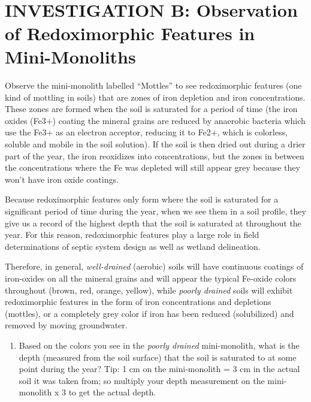 \documentclass[
  letterpaper,
  twocolumn,
  portrait]{scrbook}
\providecommand{\tightlist}{%
  \setlength{\itemsep}{0pt}\setlength{\parskip}{0pt}}\usepackage{longtable,booktabs,array}
\begin{document}
~ ~ ~

\hypertarget{investigation-b-observation-of-redoximorphic-features-in-mini-monoliths}{%
\section{INVESTIGATION B: Observation of Redoximorphic Features in
Mini-Monoliths}\label{investigation-b-observation-of-redoximorphic-features-in-mini-monoliths}}

Observe the mini-monolith labelled ``Mottles'' to see redoximorphic
features (one kind of mottling in soils) that are zones of iron
depletion and iron concentrations. These zones are formed when the soil
is saturated for a period of time (the iron oxides (Fe3+) coating the
mineral grains are reduced by anaerobic bacteria which use the Fe3+ as
an electron acceptor, reducing it to Fe2+, which is colorless, soluble
and mobile in the soil solution). If the soil is then dried out during a
drier part of the year, the iron reoxidizes into concentrations, but the
zones in between the concentrations where the Fe was depleted will still
appear grey because they won't have iron oxide coatings.

Because redoximorphic features only form where the soil is saturated for
a significant period of time during the year, when we see them in a soil
profile, they give us a record of the highest depth that the soil is
saturated at throughout the year. For this reason, redoximorphic
features play a large role in field determinations of septic system
design as well as wetland delineation.

Therefore, in general, \emph{well-drained} (aerobic) soils will have
continuous coatings of iron-oxides on all the mineral grains and will
appear the typical Fe-oxide colors throughout (brown, red, orange,
yellow), while \emph{poorly drained} soils will exhibit redoximorphic
features in the form of iron concentrations and depletions (mottles), or
a completely grey color if iron has been reduced (solubilized) and
removed by moving groundwater.

\begin{enumerate}
\def\labelenumi{\arabic{enumi}.}
\tightlist
\item
  Based on the colors you see in the \emph{poorly drained}
  mini-monolith, what is the depth (measured from the soil surface) that
  the soil is saturated to at some point during the year? Tip: 1 cm on
  the mini-monolith = 3 cm in the actual soil it was taken from; so
  multiply your depth measurement on the mini-monolith x 3 to get the
  actual depth.
\end{enumerate}
\end{document}
